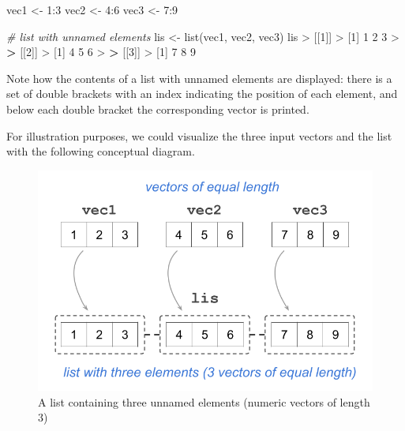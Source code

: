 \documentclass[
]{book}
\newenvironment{Shaded}{\begin{snugshade}}{\end{snugshade}}
\newcommand{\CommentTok}[1]{\textcolor[rgb]{0.56,0.35,0.01}{\textit{#1}}}
\newcommand{\DecValTok}[1]{\textcolor[rgb]{0.00,0.00,0.81}{#1}}
\newcommand{\ErrorTok}[1]{\textcolor[rgb]{0.64,0.00,0.00}{\textbf{#1}}}
\newcommand{\FunctionTok}[1]{\textcolor[rgb]{0.00,0.00,0.00}{#1}}
\newcommand{\NormalTok}[1]{#1}
\newcommand{\OtherTok}[1]{\textcolor[rgb]{0.56,0.35,0.01}{#1}}
\newcommand{\SpecialCharTok}[1]{\textcolor[rgb]{0.00,0.00,0.00}{#1}}
\begin{document}
\begin{Shaded}
\begin{Highlighting}[]
\NormalTok{vec1 }\OtherTok{\textless{}{-}} \DecValTok{1}\SpecialCharTok{:}\DecValTok{3}
\NormalTok{vec2 }\OtherTok{\textless{}{-}} \DecValTok{4}\SpecialCharTok{:}\DecValTok{6}
\NormalTok{vec3 }\OtherTok{\textless{}{-}} \DecValTok{7}\SpecialCharTok{:}\DecValTok{9}

\CommentTok{\# list with unnamed elements}
\NormalTok{lis }\OtherTok{\textless{}{-}} \FunctionTok{list}\NormalTok{(vec1, vec2, vec3)}
\NormalTok{lis}
\SpecialCharTok{\textgreater{}}\NormalTok{ [[}\DecValTok{1}\NormalTok{]]}
\SpecialCharTok{\textgreater{}}\NormalTok{ [}\DecValTok{1}\NormalTok{] }\DecValTok{1} \DecValTok{2} \DecValTok{3}
\SpecialCharTok{\textgreater{}} 
\ErrorTok{\textgreater{}}\NormalTok{ [[}\DecValTok{2}\NormalTok{]]}
\SpecialCharTok{\textgreater{}}\NormalTok{ [}\DecValTok{1}\NormalTok{] }\DecValTok{4} \DecValTok{5} \DecValTok{6}
\SpecialCharTok{\textgreater{}} 
\ErrorTok{\textgreater{}}\NormalTok{ [[}\DecValTok{3}\NormalTok{]]}
\SpecialCharTok{\textgreater{}}\NormalTok{ [}\DecValTok{1}\NormalTok{] }\DecValTok{7} \DecValTok{8} \DecValTok{9}
\end{Highlighting}
\end{Shaded}

Note how the contents of a list with unnamed elements are displayed: there is a
set of double brackets with an index indicating the position of each element,
and below each double bracket the corresponding vector is printed.

For illustration purposes, we could visualize the three input vectors and the
list with the following conceptual diagram.

\begin{figure}

{\centering \includegraphics[width=0.6\linewidth]{images/objects/obj-list-vectors1} 

}

\caption{A list containing three unnamed elements (numeric vectors of length 3)}\label{fig:unnamed-chunk-145}
\end{figure}
\end{document}
